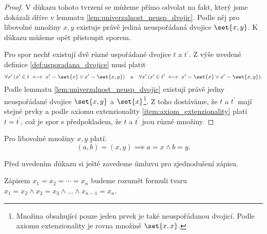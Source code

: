 \begin{proof}
    V důkazu tohoto tvrzení se můžeme přímo odvolat na fakt, který jsme dokázali dříve v lemmatu \ref{lem:univerzalnost_neusp_dvojic}. Podle něj pro libovolné množiny $x,y$ existuje právě jediná neuspořádaná dvojice $\set{x,y}$. K důkazu můžeme opět přistoupit sporem.\par
    Pro spor nechť existují dvě různé uspořádané dvojice $t$ a $t^\prime$. Z výše uvedené definice \ref{def:usporadana_dvojice} musí platit
    \begin{equation*}
        \forall x^\prime\,(x^\prime\in t \iff x^\prime=\set{x} \lor x^\prime=\set{x,y})\quad\text{a}\quad \forall x^\prime\,(x^\prime\in t^\prime \iff x^\prime=\set{x} \lor x^\prime=\set{x,y}).
    \end{equation*}
    Podle lemmatu \ref{lem:univerzalnost_neusp_dvojic} existují právě jedny neuspořádané dvojice $\set{x,y}$ a $\set{x}$\footnote{Množina obsahující pouze jeden prvek je také neuspořádanou dvojicí. Podle axiomu extenzionality je rovna množině $\set{x,x}$.}. Z toho dostáváme, že $t$ a $t^\prime$ mají stejné prvky a podle axiomu extenzionality \ref{item:axiom_extenzionality} platí $t=t^\prime$, což je spor s předpokladem, že $t$ a $t^\prime$ jsou různé množiny.
\end{proof}
\begin{lemma}\label{lem:vlastnost_usp_dvojic}
    Pro libovolné množiny $x,y$ platí:
    \begin{equation*}
        (a,b)=(x,y) \implies a=x \land b=y.
    \end{equation*}
\end{lemma}
Před uvedením důkazu si ještě zavedeme úmluvu pro zjednodušení zápisu.
\begin{convention}
    Zápisem $x_1=x_2=\cdots=x_n$ budeme rozumět formuli tvaru $x_1=x_2 \land x_2=x_3 \land \dots \land x_{n-1}=x_n$.
\end{convention}

